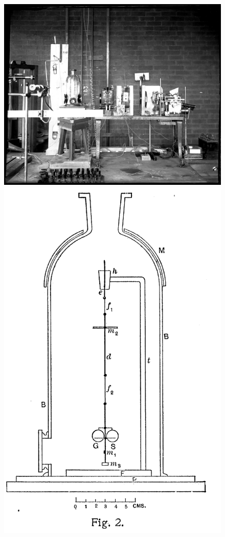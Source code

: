 \documentclass[
  a4paper,
]{book}
\begin{document}
\begin{figure}

\begin{minipage}{0.50\linewidth}

\includegraphics[width=1\linewidth,height=\textheight,keepaspectratio]{electromagnetic-waves/img/apparatus.jpg}

\end{minipage}%
%
\begin{minipage}{0.50\linewidth}

\includegraphics[width=0.65\linewidth,height=\textheight,keepaspectratio]{electromagnetic-waves/img/apparatus1.png}


\end{minipage}
\end{figure}
\end{document}
